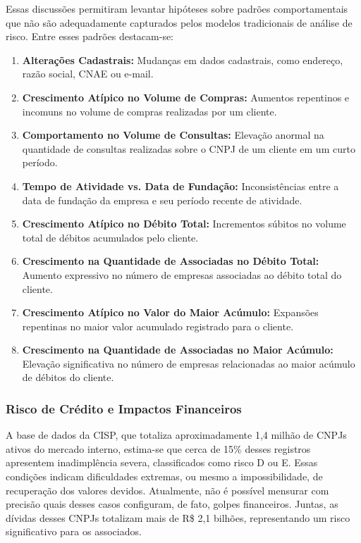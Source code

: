\documentclass[12pt,a4paper]{article}
\begin{document}
Essas discussões permitiram levantar hipóteses sobre padrões comportamentais que não são adequadamente capturados pelos modelos tradicionais de análise de risco. Entre esses padrões destacam-se:
\begin{enumerate}
    \item \textbf{Alterações Cadastrais:} Mudanças em dados cadastrais, como endereço, razão social, CNAE ou e-mail.
    \item \textbf{Crescimento Atípico no Volume de Compras:} Aumentos repentinos e incomuns no volume de compras realizadas por um cliente.
    \item \textbf{Comportamento no Volume de Consultas:} Elevação anormal na quantidade de consultas realizadas sobre o CNPJ de um cliente em um curto período.
    \item \textbf{Tempo de Atividade vs. Data de Fundação:} Inconsistências entre a data de fundação da empresa e seu período recente de atividade.
    \item \textbf{Crescimento Atípico no Débito Total:} Incrementos súbitos no volume total de débitos acumulados pelo cliente.
    \item \textbf{Crescimento na Quantidade de Associadas no Débito Total:} Aumento expressivo no número de empresas associadas ao débito total do cliente.
    \item \textbf{Crescimento Atípico no Valor do Maior Acúmulo:} Expansões repentinas no maior valor acumulado registrado para o cliente.
    \item \textbf{Crescimento na Quantidade de Associadas no Maior Acúmulo:} Elevação significativa no número de empresas relacionadas ao maior acúmulo de débitos do cliente.
\end{enumerate}

\subsubsection{Risco de Crédito e Impactos Financeiros}

A base de dados da CISP, que totaliza aproximadamente 1,4 milhão de CNPJs ativos do mercado interno, estima-se que cerca de 15\% desses registros apresentem inadimplência severa, classificados como risco D ou E. Essas condições indicam dificuldades extremas, ou mesmo a impossibilidade, de recuperação dos valores devidos. Atualmente, não é possível mensurar com precisão quais desses casos configuram, de fato, golpes financeiros. Juntas, as dívidas desses CNPJs totalizam mais de R\$ 2,1 bilhões, representando um risco significativo para os associados.
\end{document}
